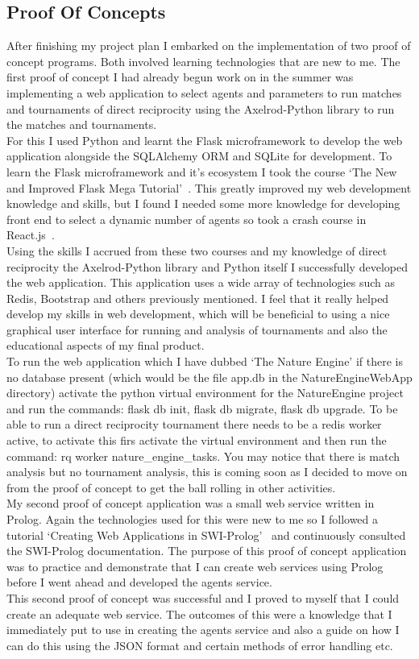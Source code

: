 \documentclass[]{final_report}
\begin{document}
\subsection{Proof Of Concepts}
After finishing my project plan I embarked on the implementation of two proof of concept programs. Both involved learning technologies that are new to me. The first proof of concept I had already begun work on in the summer was implementing a web application to select agents and parameters to run matches and tournaments of direct reciprocity using the Axelrod-Python library to run the matches and tournaments.\\
For this I used Python and learnt the Flask microframework to develop the web application alongside the SQLAlchemy ORM and SQLite for development. To learn the Flask microframework and it's ecosystem I took the course `The New and Improved Flask Mega Tutorial'~\cite{flask_tut}. This greatly improved my web development knowledge and skills, but I found I needed some more knowledge for developing front end to select a dynamic number of agents so took a crash course in React.js~\cite{react_crash_course}.\\
Using the skills I accrued from these two courses and my knowledge of direct reciprocity the Axelrod-Python library and Python itself I successfully developed the web application. This application uses a wide array of technologies such as Redis, Bootstrap and others previously mentioned. I feel that it really helped develop my skills in web development, which will be beneficial to using a nice graphical user interface for running and analysis of tournaments and also the educational aspects of my final product. \\
To run the web application which I have dubbed `The Nature Engine' if there is no database present (which would be the file app.db in the NatureEngineWebApp directory) activate the python virtual environment for the NatureEngine project and run the commands: flask db init, flask db migrate, flask db upgrade. To be able to run a direct reciprocity tournament there needs to be a redis worker active, to activate this firs activate the virtual environment and then run the command: rq worker nature\_engine\_tasks. You may notice that there is match analysis but no tournament analysis, this is coming soon as I decided to move on from the proof of concept to get the ball rolling in other activities.\\
My second proof of concept application was a small web service written in Prolog. Again the technologies used for this were new to me so I followed a tutorial `Creating Web Applications in SWI-Prolog'~\cite{swi_web_tut} and continuously consulted the SWI-Prolog documentation. The purpose of this proof of concept application was to practice and demonstrate that I can create web services using Prolog before I went ahead and developed the agents service.\\
This second proof of concept was successful and I proved to myself that I could create an adequate web service. The outcomes of this were a knowledge that I immediately put to use in creating the agents service and also a guide on how I can do this using the JSON format and certain methods of error handling etc.
\end{document}
